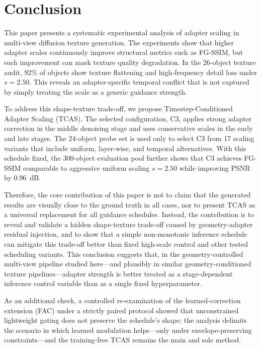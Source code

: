 \documentclass[times,twocolumn,final]{elsarticle}
\begin{document}
\section{Conclusion}
\label{sec:conclusion}

This paper presents a systematic experimental analysis of adapter scaling in multi-view diffusion texture generation. The experiments show that higher adapter scales continuously improve structural metrics such as FG-SSIM, but such improvement can mask texture quality degradation. In the 26-object texture audit, 92\% of objects show texture flattening and high-frequency detail loss under $s = 2.50$. This reveals an adapter-specific temporal conflict that is not captured by simply treating the scale as a generic guidance strength.

To address this shape-texture trade-off, we propose Timestep-Conditioned Adapter Scaling (TCAS). The selected configuration, C3, applies strong adapter correction in the middle denoising stage and uses conservative scales in the early and late stages. The 24-object probe set is used only to select C3 from 17 scaling variants that include uniform, layer-wise, and temporal alternatives. With this schedule fixed, the 300-object evaluation pool further shows that C3 achieves FG-SSIM comparable to aggressive uniform scaling $s = 2.50$ while improving PSNR by 0.96~dB.

Therefore, the core contribution of this paper is not to claim that the generated results are visually close to the ground truth in all cases, nor to present TCAS as a universal replacement for all guidance schedules. Instead, the contribution is to reveal and validate a hidden shape-texture trade-off caused by geometry-adapter residual injection, and to show that a simple non-monotonic inference schedule can mitigate this trade-off better than fixed high-scale control and other tested scheduling variants. This conclusion suggests that, in the geometry-controlled multi-view pipeline studied here---and plausibly in similar geometry-conditioned texture pipelines---adapter strength is better treated as a stage-dependent inference control variable than as a single fixed hyperparameter.

As an additional check, a controlled re-examination of the learned-correction extension (FAC) under a strictly paired protocol showed that unconstrained lightweight gating does not preserve the schedule's shape; the analysis delimits the scenario in which learned modulation helps---only under envelope-preserving constraints---and the training-free TCAS remains the main and sole method.
\end{document}
